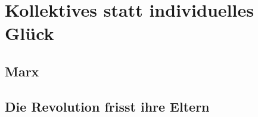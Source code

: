 %
%
%

\chapter{Kollektives statt individuelles Glück}
\label{Marx}

\section{Marx}

\section{Die Revolution frisst ihre Eltern}